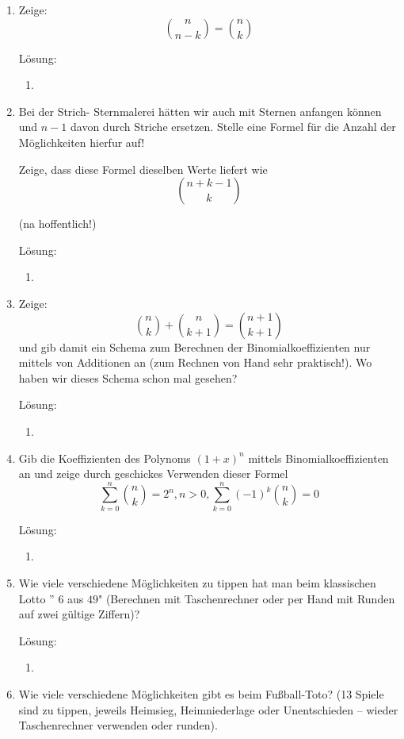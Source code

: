 \documentclass[../main.tex]{subfiles}
\begin{document}
\begin{enumerate}
	\item Zeige:
	      \[ \binom{n}{n - k} = \binom{n}{k} \]

	      Lösung:
	      \begin{enumerate}
		      \item
	      \end{enumerate}
	\item Bei der Strich- Sternmalerei hätten wir auch mit Sternen anfangen können
	      und \( n - 1 \) davon durch Striche ersetzen. Stelle eine Formel für die Anzahl der Möglichkeiten hierfur auf!

	      Zeige, dass diese Formel dieselben Werte liefert wie
	      \[ \binom{ n + k - 1}{ k} \]

	      (na hoffentlich!)

	      Lösung:
	      \begin{enumerate}
		      \item
	      \end{enumerate}
	\item Zeige:
	      \[ \binom{n}{k} + \binom{n}{ k + 1} = \binom{n + 1}{k + 1} \]
	      und gib damit ein Schema zum Berechnen der Binomialkoeffizienten nur
	      mittels von Additionen an (zum Rechnen von Hand sehr praktisch!). Wo
	      haben wir dieses Schema schon mal gesehen?

	      Lösung:
	      \begin{enumerate}
		      \item
	      \end{enumerate}
	\item  Gib die Koeffizienten des Polynoms \( (1 + x)^n \) mittels Binomialkoeffizienten
	      an und zeige durch geschickes Verwenden dieser Formel
	      \[ \sum_{ k= 0}^{n} \binom{n}{k} = 2^n, n > 0, \sum_{k = 0}^{n} (-1)^k \binom{n}{k} = 0 \]

	      Lösung:
	      \begin{enumerate}
		      \item
	      \end{enumerate}
	\item Wie viele verschiedene Möglichkeiten zu tippen hat man beim klassischen
	      Lotto ” \( 6 \) aus \( 49 \)" (Berechnen mit Taschenrechner oder per Hand mit Runden
	      auf zwei gültige Ziffern)?

	      Lösung:
	      \begin{enumerate}
		      \item
	      \end{enumerate}
	\item Wie viele verschiedene Möglichkeiten gibt es beim Fußball-Toto?
	      (13 Spiele sind zu tippen, jeweils Heimsieg, Heimniederlage oder Unentschieden –
	      wieder Taschenrechner verwenden oder runden).


\end{enumerate}
\end{document}
